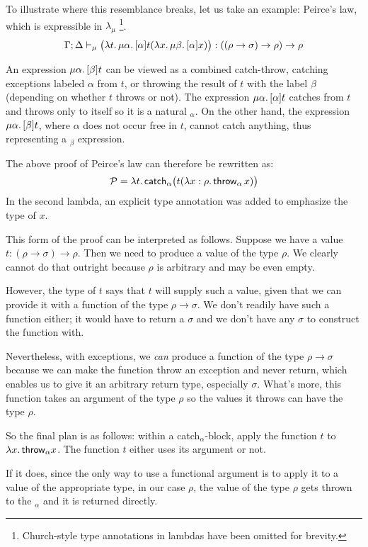To illustrate where this resemblance breaks, let us take an example: Peirce's law, which is
expressible in $\lambda_\mu$ \cite{krebbers11}\footnote{Church-style type annotations
in lambdas have been omitted for brevity.}.
\[ \Gamma; \Delta \vdash_\mu 
    \big(\lambda t.\, \mu \alpha.\, [\alpha] t (\lambda x.\, \mu \beta.\, [\alpha] x) \big)
      : ((\rho \to \sigma) \to \rho) \to \rho
\]

An expression $\mu \alpha.\,[\beta]t$ can be viewed as a combined catch-throw, catching
exceptions labeled $\alpha$ from $t$, or throwing the result of $t$ with the label $\beta$
(depending on whether $t$ throws or not). The expression $\mu \alpha.\,[\alpha]t$ catches
from $t$ and throws only to itself so it is a natural $_\alpha$. On the
other hand, the expression $\mu \alpha.\,[\beta]t$, where $\alpha$ does not occur free in
$t$, cannot catch anything, thus representing a $_\beta$ expression.

The above proof of Peirce's law can therefore be rewritten as:
\[ \mathcal{P} = \lambda t.\, \mathsf{catch}_\alpha \big(t (\lambda x : \rho.\, \mathsf{throw}_\alpha\, x)\big) \]
In the second lambda, an explicit type annotation was added to emphasize the type of $x$.

This form of the proof can be interpreted as follows. Suppose we have a value
$t : (\rho \to \sigma) \to \rho$. Then we need to produce a value of the type $\rho$.
We clearly cannot do that outright because $\rho$ is arbitrary and may be even empty.

However, the type of $t$ says that $t$ will supply such a value, given that we can provide
it with a function of the type $\rho \to \sigma$. We don't readily have such a function either;
it would have to return a $\sigma$ and we don't have any $\sigma$ to construct the function with.

Nevertheless, with exceptions, we \emph{can} produce a function of the type $\rho \to \sigma$
because we can make the function throw an exception and never return, which enables us
to give it an arbitrary return type, especially $\sigma$. What's more, this function
takes an argument of the type $\rho$ so the values it throws can have the type $\rho$.

So the final plan is as follows: within a catch$_\alpha$-block, apply the function $t$ to
$\lambda x.\, \mathsf{throw}_\alpha x$. The function $t$ either uses its argument or not.

If it does, since
the only way to use a functional argument is to apply it to a value of the
appropriate type, in our case $\rho$, the value of the type $\rho$ gets thrown to the
$_\alpha$ and it is returned directly.


